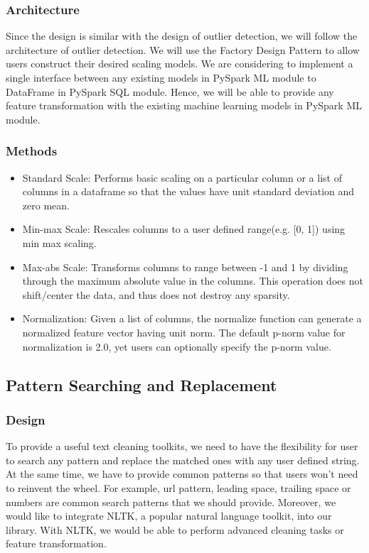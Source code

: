 \documentclass[sigconf]{acmart}
\begin{document}
\subsubsection{Architecture}
Since the design is similar with the design of outlier detection, we will follow the architecture of outlier detection. We will use the Factory Design Pattern to allow users construct their desired scaling models. We are considering to implement a single interface between any existing models in PySpark ML module to DataFrame in PySpark SQL module. Hence, we will be able to provide any feature transformation with the existing machine learning models in PySpark ML module.

\subsubsection{Methods}
\begin{itemize}
	\item{Standard Scale}: Performs basic scaling on a particular column or a list of columns in a dataframe so that the values have unit standard deviation and zero mean. 
	\item{Min-max Scale}: Rescales columns to a user defined range(e.g. [0, 1]) using min max scaling.
	\item{Max-abs Scale}: Transforms columns to range between -1 and 1 by dividing through the maximum absolute value in the columns. This operation does not shift/center the data, and thus does not destroy any sparsity. 
	\item{Normalization}: Given a list of columns, the normalize function can generate a normalized feature vector having unit norm. The default p-norm value for normalization is 2.0, yet users can optionally specify the p-norm value.
\end{itemize}

\subsection{Pattern Searching and Replacement}
\subsubsection{Design} 
To provide a useful text cleaning toolkits, we need to have the flexibility for user to search any pattern and replace the matched ones with any user defined string. At the same time, we have to provide common patterns so that users won't need to reinvent the wheel. For example, url pattern, leading space, trailing space or numbers are common search patterns that we should provide. Moreover, we would like to integrate NLTK\cite{nltk}, a popular natural language toolkit, into our library. With NLTK, we would be able to perform advanced cleaning tasks or feature transformation.
\end{document}
